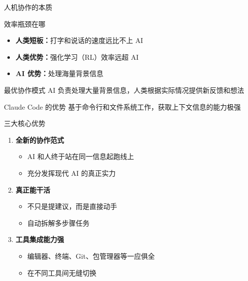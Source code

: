 \documentclass[aspectratio=169,xcolor=dvipsnames]{beamer}
\begin{document}
\begin{frame}{人机协作的本质}
  \begin{block}{效率瓶颈在哪}
    \begin{itemize}
      \item \textbf{人类短板：}打字和说话的速度远比不上 AI
      \item \textbf{人类优势：}强化学习（RL）效率远超 AI
      \item \textbf{AI 优势：}处理海量背景信息
    \end{itemize}
  \end{block}

  \vspace{0.3cm}

  \begin{exampleblock}{最优协作模式}
    AI 负责处理大量背景信息，人类根据实际情况提供新反馈和想法
  \end{exampleblock}

  \vspace{0.3cm}

  \begin{alertblock}{Claude Code 的优势}
    基于命令行和文件系统工作，获取上下文信息的能力极强
  \end{alertblock}
\end{frame}

\begin{frame}{三大核心优势}
  \begin{enumerate}
    \item \textbf{全新的协作范式}
    \begin{itemize}
      \item AI 和人终于站在同一信息起跑线上
      \item 充分发挥现代 AI 的真正实力
    \end{itemize}

    \vspace{0.3cm}

    \item \textbf{真正能干活}
    \begin{itemize}
      \item 不只是提建议，而是直接动手
      \item 自动拆解多步骤任务
    \end{itemize}

    \vspace{0.3cm}

    \item \textbf{工具集成能力强}
    \begin{itemize}
      \item 编辑器、终端、Git、包管理器等一应俱全
      \item 在不同工具间无缝切换
    \end{itemize}
  \end{enumerate}
\end{frame}
\end{document}
